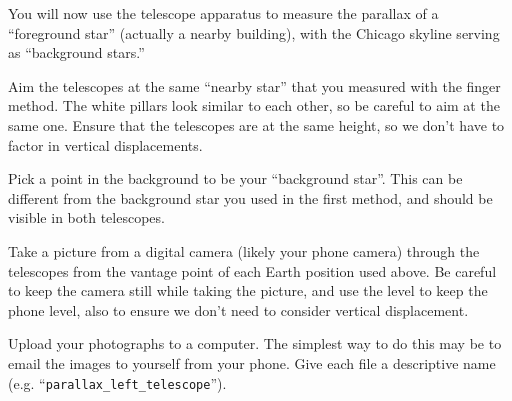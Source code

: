 You will now use the telescope apparatus to measure the parallax of a “foreground star”
(actually a nearby building), with the
Chicago skyline
serving as “background stars.”
\begin{steps}
    \item Aim the telescopes at the same ``nearby star'' that you measured with the finger method. The white pillars look similar to each other, so be careful to aim at the same one. Ensure that the telescopes are at the same height, so we don't have to factor in vertical displacements.
    
    \item Pick a point in the background to be your ``background star''. This can be different from the background star you used in the first method, and should be visible in both telescopes.

	\item Take a picture from a digital camera (likely your phone camera) through the telescopes from the vantage point of each Earth position used above. Be careful to keep the camera still while taking the picture, and use the level to keep the phone level, also to ensure we don't need to consider vertical displacement.
	


	\item Upload your photographs to a computer. The simplest way to do this may be to email the images to yourself from your phone. Give each file a descriptive name (e.g. ``\texttt{parallax\_left\_telescope}'').
\end{steps}

